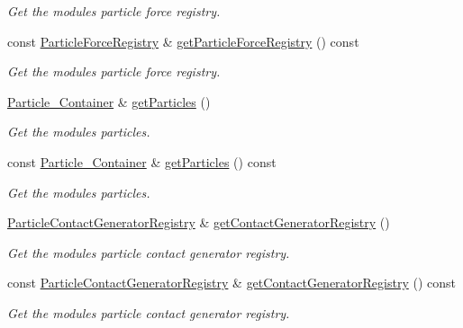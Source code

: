 \begin{DoxyCompactItemize}
\begin{DoxyCompactList}\small\item\em Get the module\textquotesingle{}s particle force registry. \end{DoxyCompactList}\item 
const \mbox{\hyperlink{classr3_1_1_particle_force_registry}{Particle\+Force\+Registry}} \& \mbox{\hyperlink{classr3_1_1_particle_world_add0e006264e25065ff226eafc0c1a29d}{get\+Particle\+Force\+Registry}} () const
\begin{DoxyCompactList}\small\item\em Get the module\textquotesingle{}s particle force registry. \end{DoxyCompactList}\item 
\mbox{\hyperlink{classr3_1_1_particle_world_aa354f6786c0837674fe8286f00465631}{Particle\+\_\+\+Container}} \& \mbox{\hyperlink{classr3_1_1_particle_world_a00a5014002f28e35ebb59a3f8175db3c}{get\+Particles}} ()
\begin{DoxyCompactList}\small\item\em Get the module\textquotesingle{}s particles. \end{DoxyCompactList}\item 
const \mbox{\hyperlink{classr3_1_1_particle_world_aa354f6786c0837674fe8286f00465631}{Particle\+\_\+\+Container}} \& \mbox{\hyperlink{classr3_1_1_particle_world_ab816d6bca8b42fdf16170275087008f0}{get\+Particles}} () const
\begin{DoxyCompactList}\small\item\em Get the module\textquotesingle{}s particles. \end{DoxyCompactList}\item 
\mbox{\hyperlink{classr3_1_1_particle_contact_generator_registry}{Particle\+Contact\+Generator\+Registry}} \& \mbox{\hyperlink{classr3_1_1_particle_world_a85fc9fcf5c51a5bbce206a35a82f8ccf}{get\+Contact\+Generator\+Registry}} ()
\begin{DoxyCompactList}\small\item\em Get the module\textquotesingle{}s particle contact generator registry. \end{DoxyCompactList}\item 
const \mbox{\hyperlink{classr3_1_1_particle_contact_generator_registry}{Particle\+Contact\+Generator\+Registry}} \& \mbox{\hyperlink{classr3_1_1_particle_world_ab5cd3adaed73294927de72f3293b0709}{get\+Contact\+Generator\+Registry}} () const
\begin{DoxyCompactList}\small\item\em Get the module\textquotesingle{}s particle contact generator registry. \end{DoxyCompactList}\end{DoxyCompactItemize}
